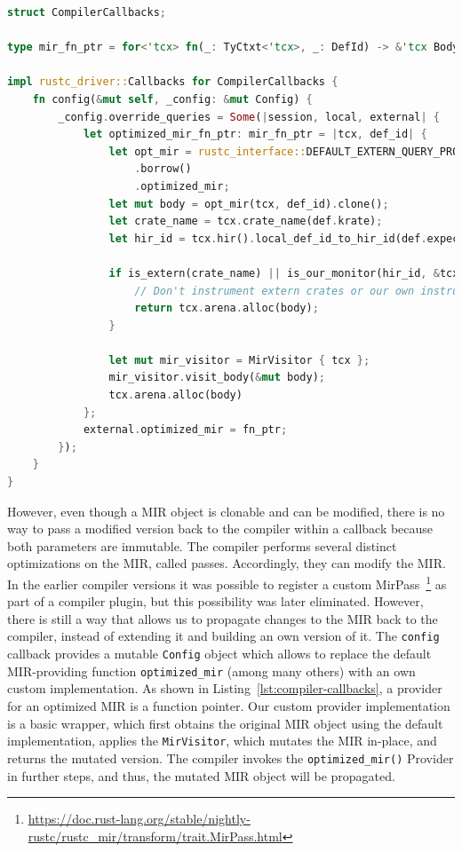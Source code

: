 \documentclass{article}
\begin{document}
\begin{lstlisting}[language=Rust, style=boxed, caption={The Rust compiler interface accepts an object which implements its callback trait, allowing us to execute code at different compilation phases}, label=lst:compiler-callbacks]
struct CompilerCallbacks;

type mir_fn_ptr = for<'tcx> fn(_: TyCtxt<'tcx>, _: DefId) -> &'tcx Body<'tcx>;

impl rustc_driver::Callbacks for CompilerCallbacks {
    fn config(&mut self, _config: &mut Config) {
        _config.override_queries = Some(|session, local, external| {
            let optimized_mir_fn_ptr: mir_fn_ptr = |tcx, def_id| {
                let opt_mir = rustc_interface::DEFAULT_EXTERN_QUERY_PROVIDERS
                    .borrow()
                    .optimized_mir;
                let mut body = opt_mir(tcx, def_id).clone();
                let crate_name = tcx.crate_name(def.krate);
                let hir_id = tcx.hir().local_def_id_to_hir_id(def.expect_local());

                if is_extern(crate_name) || is_our_monitor(hir_id, &tcx) {
                    // Don't instrument extern crates or our own instrumentation code
                    return tcx.arena.alloc(body);
                }

                let mut mir_visitor = MirVisitor { tcx };
                mir_visitor.visit_body(&mut body);
                tcx.arena.alloc(body)
            };
            external.optimized_mir = fn_ptr;
        });
    }
}
\end{lstlisting}
However, even though a \ac{MIR} object is clonable and can be modified, there is no way to pass a modified version back to the compiler within a callback because both parameters are immutable. The compiler performs several distinct optimizations on the MIR, called passes. Accordingly, they can modify the MIR. In the earlier compiler versions it was possible to register a custom MirPass~\footnote{\url{https://doc.rust-lang.org/stable/nightly-rustc/rustc_mir/transform/trait.MirPass.html}} as part of a compiler plugin, but this possibility was later eliminated. However, there is still a way that allows us to propagate changes to the MIR back to the compiler, instead of extending it and building an own version of it. The \lstinline{config} callback provides a mutable \lstinline{Config} object which allows to replace the default \ac{MIR}-providing function \lstinline{optimized_mir} (among many others) with an own custom implementation. As shown in Listing~\ref{lst:compiler-callbacks}, a provider for an optimized \ac{MIR} is a function pointer. Our custom provider implementation is a basic wrapper, which first obtains the original \ac{MIR} object using the default implementation, applies the \lstinline{MirVisitor}, which mutates the MIR in-place, and returns the mutated version. The compiler invokes the \lstinline{optimized_mir()} Provider in further steps, and thus, the mutated \ac{MIR} object will be propagated.
\end{document}
